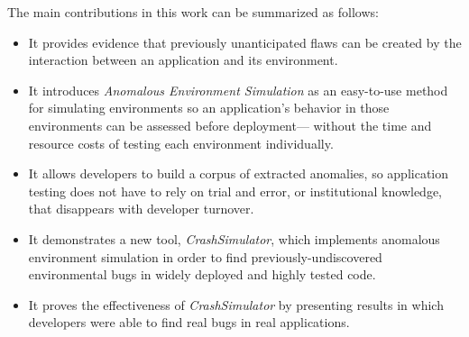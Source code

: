 The main contributions in this work can be summarized as follows:

\begin{itemize}

\item{It provides evidence
that previously unanticipated flaws can be created by the interaction
between an application and its environment.}

\item{It introduces \textit{Anomalous Environment Simulation}
as an easy-to-use method for simulating environments
so an application's behavior in those environments
can be assessed before deployment---
without the time and resource costs of
testing each environment individually.}

\item{It allows developers to build a corpus of extracted anomalies, so
    application testing does not have to rely on trial and error,
    or institutional knowledge,
    that disappears with developer turnover.}

\item{It demonstrates a new tool, {\em CrashSimulator},
which implements anomalous environment simulation
in order to find previously-undiscovered environmental bugs
in widely deployed and highly tested code.}

\item{It proves the effectiveness
of {\em CrashSimulator}
by presenting results
in which developers
were able to find real bugs in real applications.}

\end{itemize}
